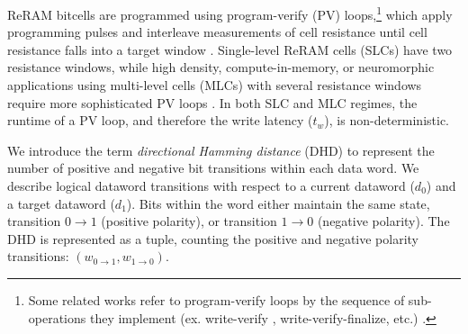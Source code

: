 
ReRAM bitcells are programmed using program-verify (PV) loops,\footnote{Some related works refer to program-verify loops by the sequence of sub-operations they implement (ex. write-verify , write-verify-finalize, etc.) \cite{kawahara2013filament, fukuyama2019comprehensive}.}
which apply programming pulses and interleave measurements of cell resistance until cell resistance falls into a target window \cite{jo2009programmable, yu2012switching, fukuyama2019comprehensive, milo2021accurate}. Single-level ReRAM cells (SLCs) have two resistance windows, while high density, compute-in-memory, or neuromorphic applications using multi-level cells (MLCs) with several resistance windows require more sophisticated PV loops \cite{puglisi2015novel, milo2021accurate}. In both SLC and MLC regimes, the runtime of a PV loop, and therefore the write latency ($t_w$), is non-deterministic. 

We introduce the term  \emph{directional Hamming distance} (DHD) to represent the number of positive and negative bit transitions within each data word.
We describe logical dataword transitions with respect to a current dataword ($d_0$) and a target dataword ($d_1$). Bits within the word either maintain the same state, transition $0\to1$ (positive polarity), or transition $1\to0$ (negative polarity).  The DHD is represented as a tuple, counting the positive and negative polarity transitions: $\left( w_{0\to1}, w_{1\to0} \right)$.

